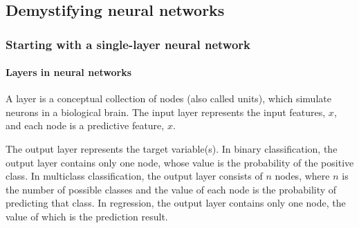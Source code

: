 \chapter{\label{Ch08}}
\section{Demystifying neural networks}
\subsection{Starting with a single-layer neural network}
\subsubsection*{Layers in neural networks}
A layer is a conceptual collection of nodes (also called units), which simulate neurons in a biological brain. The input layer represents the input features, $x$, and each node is a predictive feature, $x$.

The output layer represents the target variable(s). In binary classification, the output layer contains only one node, whose value is the probability of the positive class. In multiclass classification, the output layer consists of $n$ nodes, where $n$ is the number of possible classes and the value of each node is the probability of predicting that class. In regression, the output layer contains only one node, the value of which is the prediction result.
